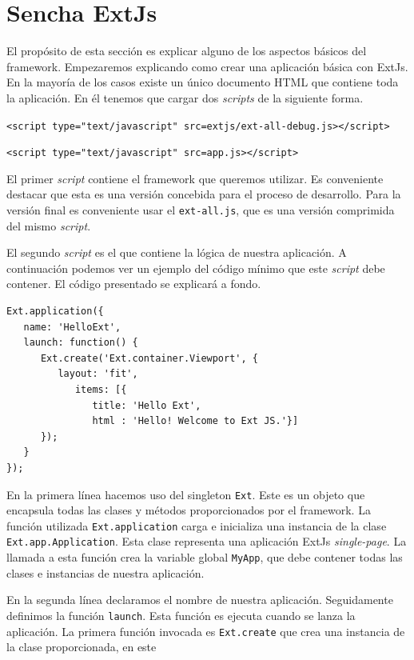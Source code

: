 \section{Sencha ExtJs}
	El propósito de esta sección es explicar alguno de los aspectos básicos del framework. Empezaremos explicando como crear una aplicación básica
	con ExtJs. En la mayoría de los casos existe un único documento HTML\cite{HTML} que contiene toda la aplicación. En él tenemos que cargar dos
	\emph{scripts} de la siguiente forma.
    		\begin{center} \texttt{<script type="text/javascript" src=\textquotedbl extjs/ext-all-debug.js\textquotedbl ></script>}  \end{center}
    		\begin{center} \texttt{<script type="text/javascript" src=\textquotedbl app.js\textquotedbl ></script>}  \end{center}
	El primer \emph{script} contiene el framework que queremos utilizar. Es conveniente destacar que esta es una versión concebida para el proceso
	de desarrollo. Para la versión final es conveniente usar el \texttt{ext-all.js}, que es una versión comprimida del mismo \emph{script}.
 	\par
	El segundo \emph{script} es el que contiene la lógica de nuestra aplicación. A continuación podemos ver un ejemplo del código mínimo que este
	\emph{script} debe contener. El código presentado se explicará a fondo.
	\begin{lstlisting}[style=myJs]
Ext.application({
   name: 'HelloExt',
   launch: function() {
      Ext.create('Ext.container.Viewport', {
         layout: 'fit',
            items: [{
               title: 'Hello Ext',
               html : 'Hello! Welcome to Ext JS.'}] 
      }); 
   } 
});
	\end{lstlisting}
	\par
	En la primera línea hacemos uso del singleton \texttt{Ext}. Este es un objeto que encapsula todas las clases y métodos proporcionados por el
	framework. La función utilizada \texttt{Ext.application} carga e inicializa una instancia de la clase \texttt{Ext.app.Application}. Esta clase
	representa una aplicación ExtJs \emph{single-page}. La llamada a esta función crea la variable global \texttt{MyApp}, que debe contener todas las
	clases e instancias de nuestra aplicación.
 	\par
	En la segunda línea declaramos el nombre de nuestra aplicación. Seguidamente definimos la función \texttt{launch}. Esta función es ejecuta
	cuando se lanza la aplicación. La primera función invocada es \texttt{Ext.create} que crea una instancia de la clase proporcionada, en este
